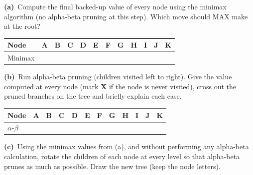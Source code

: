 \documentclass[11pt,a4paper]{article}
\newcommand{\subq}[1]{\par\smallskip\noindent\textbf{#1}\ }
\begin{document}
\subq{(a)}Compute the final backed-up value of every node using the minimax algorithm (no alpha-beta pruning at this step). Which move should MAX make at the root?
\begin{center}\small \begin{tabular}{|l|c|c|c|c|c|c|c|c|c|c|c|}\hline
\textbf{Node} & \textbf{A} & \textbf{B} & \textbf{C} & \textbf{D} & \textbf{E} & \textbf{F} & \textbf{G} & \textbf{H} & \textbf{I} & \textbf{J} & \textbf{K}\\ \hline
Minimax & \phantom{00} & \phantom{00} & \phantom{00} & \phantom{00} & \phantom{00} & \phantom{00} & \phantom{00} & \phantom{00} & \phantom{00} & \phantom{00} & \phantom{00}\\[1.5mm] \hline
\end{tabular}\end{center}\begin{ansbox}[height=0.8cm]\end{ansbox}
\subq{(b)}Run alpha-beta pruning (children visited left to right). Give the value computed at every node (mark \textbf{X} if the node is never visited), cross out the pruned branches on the tree and briefly explain each case.
\begin{center}\small \begin{tabular}{|l|c|c|c|c|c|c|c|c|c|c|c|}\hline
\textbf{Node} & \textbf{A} & \textbf{B} & \textbf{C} & \textbf{D} & \textbf{E} & \textbf{F} & \textbf{G} & \textbf{H} & \textbf{I} & \textbf{J} & \textbf{K}\\ \hline
$\alpha$-$\beta$ & \phantom{00} & \phantom{00} & \phantom{00} & \phantom{00} & \phantom{00} & \phantom{00} & \phantom{00} & \phantom{00} & \phantom{00} & \phantom{00} & \phantom{00}\\[1.5mm] \hline
\end{tabular}\end{center}\begin{ansbox}[height=4.0cm]\end{ansbox}
\subq{(c)}Using the minimax values from (a), and without performing any alpha-beta calculation, rotate the children of each node at every level so that alpha-beta prunes as much as possible. Draw the new tree (keep the node letters).
\begin{ansbox}[height=5.5cm]\end{ansbox}
\clearpage
\end{document}
